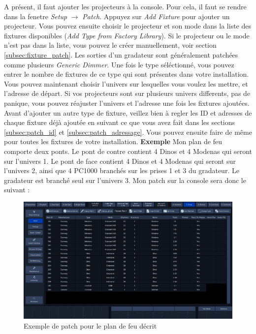 A présent, il faut ajouter les projecteurs à la console. Pour cela, il faut se rendre dans la fenetre \textit{Setup} $\rightarrow$ \textit{Patch}.
\newline
Appuyez sur \textit{Add Fixture} pour ajouter un projecteur. Vous pouvez ensuite choisir le projecteur et son mode dans la liste des fixtures disponibles (\textit{Add Type from Factory Library}).
Si le projecteur ou le mode n'est pas dans la liste, vous pouvez le créer manuellement, voir section \ref{subsec:fixture_patch}.
\newline
Les sorties d'un gradateur sont généralement patchées comme plusieurs \textit{Generic Dimmer}.
\newline
\newline
Une fois le type séléctionné, vous pouvez entrer le nombre de fixtures de ce type qui sont présentes dans votre installation.
\newline
Vous pouvez maintenant choisir l'univers sur lesquelles vous voulez les mettre, et l'adresse de départ.
Si vos projecteurs sont sur plusieurs univers differents, pas de panique, vous pouvez réajuster l'univers et l'adresse une fois les fixtures ajoutées.
\newline
Avant d'ajouter un autre type de fixture, veillez bien à regler les ID et adresses de chaque fixture déjà ajoutée en suivant ce que vous avez fait dans les sections \ref{subsec:patch_id} et \ref{subsec:patch_adressage}.
\newline
\newline
Vous pouvez ensuite faire de même pour toutes les fixtures de votre installation.
\newline
\newline
\textbf{Exemple}
\newline
\newline
Mon plan de feu comporte deux ponts. Le pont de contre contient 4 Dinos et 4 Modenas qui seront sur l'univers 1.
Le pont de face contient 4 Dinos et 4 Modenas qui seront sur l'univers 2, ainsi que 4 PC1000 branchés sur les prises 1 et 3 du gradateur.
Le gradateur est branché seul sur l'univers 3.
\newline
Mon patch sur la console sera donc le suivant :
\begin{figure}[H]
    \centering
    \includegraphics[width=\textwidth]{3 - Encoder la Chimp/Images/patch.jpg}
    \caption{Exemple de patch pour le plan de feu décrit}
    \label{fig:exemple_patch}
\end{figure}

